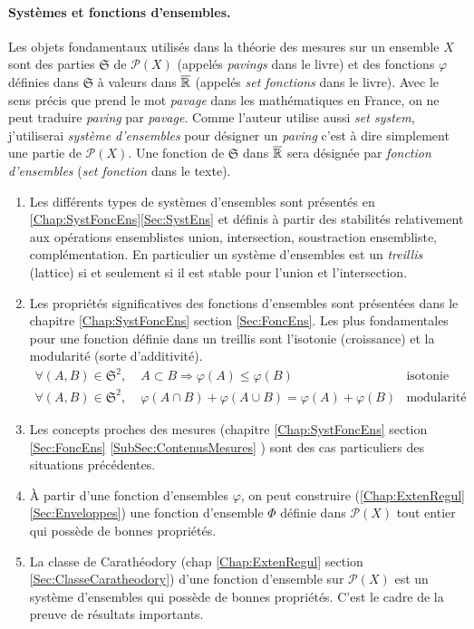 \paragraph*{Systèmes et fonctions d'ensembles.}
Les objets fondamentaux utilisés dans la théorie des mesures sur un ensemble $X$ sont des parties $\mathfrak{S}$ de $\mathcal{P}(X)$ (appelés \emph{pavings} dans le livre) et des fonctions $\varphi$ définies dans $\mathfrak{S}$ à valeurs dans $\overline{\mathbb{R}}$ (appelés \emph{set fonctions} dans le livre).\newline
Avec le sens précis que prend le mot \emph{pavage} dans les mathématiques en France, on ne peut traduire \emph{paving} par \emph{pavage}. Comme l'auteur utilise aussi \emph{set system}, j'utiliserai \emph{système d'ensembles} pour désigner un \emph{paving} c'est à dire simplement une partie de $\mathcal{P}(X)$.\newline
Une fonction de $\mathfrak{S}$ dans $\overline{\mathbb{R}}$ sera désignée par \emph{fonction d'ensembles} (\emph{set fonction} dans le texte).

\begin{enumerate}
 \item  Les différents types de systèmes d'ensembles sont présentés en \ref{Chap:SystFoncEns}\ref{Sec:SystEns} et définis à partir des stabilités relativement aux opérations ensemblistes union, intersection, soustraction ensembliste, complémentation.\newline
 En particulier un système d'ensembles est un \emph{treillis} (lattice) si et seulement si il est stable pour l'union et l'intersection.
 \item Les propriétés significatives des fonctions d'ensembles sont présentées dans le chapitre \ref{Chap:SystFoncEns} section \ref{Sec:FoncEns}. Les plus fondamentales pour une fonction définie dans un treillis sont l'isotonie (croissance) et la modularité (sorte d'additivité).
 \begin{displaymath}
   \begin{aligned}
     \forall (A,B) \in \mathfrak{S}^2, \;& A \subset B \Rightarrow \varphi(A) \leq \varphi(B) &\text{isotonie}& \\
     \forall (A,B) \in \mathfrak{S}^2, \;&  \varphi(A\cap B) + \varphi(A \cup B) = \varphi(A) + \varphi(B) &\text{modularité}&
   \end{aligned}
 \end{displaymath}

 \item Les concepts proches des mesures (chapitre \ref{Chap:SystFoncEns} section \ref{Sec:FoncEns} \ref{SubSec:ContenusMesures} ) sont des cas particuliers des situations précédentes.
 \item À partir d'une fonction d'ensembles $\varphi$, on peut construire (\ref{Chap:ExtenRegul} \ref{Sec:Enveloppes}) une fonction d'ensemble $\Phi$ définie dans $\mathcal{P}(X)$ tout entier qui possède de bonnes propriétés.
 \item La classe de Carathéodory (chap \ref{Chap:ExtenRegul} section \ref{Sec:ClasseCaratheodory}) d'une fonction d'ensemble sur $\mathcal{P}(X)$ est un système d'ensembles qui possède de bonnes propriétés. C'est le cadre de la preuve de résultats importants.
\end{enumerate}

